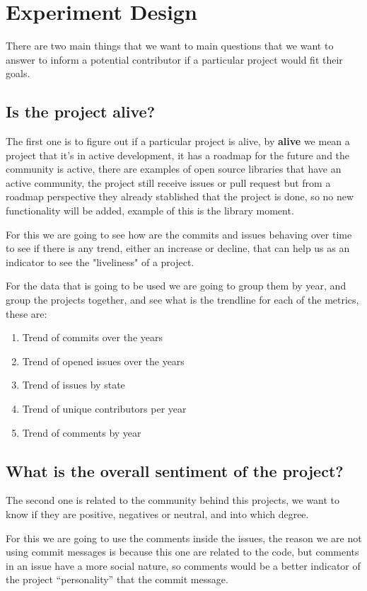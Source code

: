 \section{Experiment Design}
There are two main things that we want to main questions that we want to answer to inform a potential contributor if a particular project would fit their goals.

\subsection{Is the project alive?}
The first one is to figure out if a particular project is alive, by \textbf{alive} we mean a project that it's in active development, it has a roadmap for the future and the community is active, there are examples of open source libraries that have an active community, the project still receive issues or pull request but from a roadmap perspective they already stablished that the project is done, so no new functionality will be added, example of this is the library moment\cite{moment}.

For this we are going to see how are the commits and issues behaving over time to see if there is any trend, either an increase or decline, that can help us as an indicator to see the "liveliness" of a project.

For the data that is going to be used we are going to group them by year, and group the projects together, and see what is the trendline for each of the metrics, these are:
\begin{enumerate}
    \fontsize{10pt}{10pt}
    \selectfont
    \item Trend of commits over the years
    \item Trend of opened issues over the years
    \item Trend of issues by state
    \item Trend of unique contributors per year
    \item Trend of comments by year
\end{enumerate}

\subsection{What is the overall sentiment of the project?}
The second one is related to the community behind this projects, we want to know if they are positive, negatives or neutral, and into which degree.

For this we are going to use the comments inside the issues, the reason we are not using commit messages is because this one are related to the code, but comments in an issue have a more social nature, so comments would be a better indicator of the project “personality” that the commit message.

